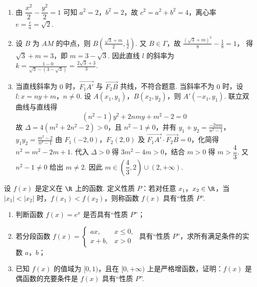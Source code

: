 \begin{solution}
\begin{enumerate}
\item 由 \(\dfrac{x^2}{2}-\dfrac{y^2}{2}=1\) 可知 \(a^2=2\)，\(b^2=2\)，故 \(c^2=a^2+b^2=4\)，离心率 \(e=\frac ca=\sqrt2\).

\item 设 \(B\) 为 \(AM\) 的中点，则
\(B\left(\frac{\sqrt3+m}{2},\frac12\right)\).
又 \(B\in\Gamma\)，故
\(\frac{(\sqrt3+m)^2}{8}-\frac{1}{8}=1\)，
得 \(\sqrt3+m=3\)，即 \(m=3-\sqrt3\).
因此直线 \(l\) 的斜率为
\(k=\frac{1-0}{\sqrt3-(3-\sqrt3)}=\frac{2\sqrt3+3}{3}\).

\item 当直线斜率为 \(0\) 时，\(\overrightarrow{F_1A'}\) 与 \(\overrightarrow{F_2B}\) 共线，不符合题意. 当斜率不为 \(0\) 时，设 \(l:x=ny+m\)，\(n\ne0\). 设 \(A(x_1,y_1)\)，\(B(x_2,y_2)\)，则 \(A'(-x_1,y_1)\).
联立双曲线与直线得
\[
(n^2-1)y^2+2nmy+m^2-2=0
\]
故 \(\Delta=4(m^2+2n^2-2)>0\)，且 \(n^2-1\ne0\)，并有
\(y_1+y_2=\frac{-2nm}{n^2-1}\)，\(y_1y_2=\frac{m^2-2}{n^2-1}\)
由 \(F_1(-2,0)\)，\(F_2(2,0)\) 及 \(\overrightarrow{F_1A'}\cdot\overrightarrow{F_2B}=0\)，化简得 \(n^2=m^2-2m+1\). 代入 \(\Delta>0\) 得 \(3m^2-4m>0\)，结合 \(m>0\) 得 \(m>\dfrac43\). 又 \(n^2-1\ne0\) 给出 \(m\ne2\). 因此 \(m\in\left(\dfrac43,2\right)\cup(2,+\infty)\).
\end{enumerate}
\end{solution}

\begin{problem}
设 \(f(x)\) 是定义在 \(\R\) 上的函数. 定义性质 \(P\)：若对任意 \(x_1\)，\(x_2\in\R\)，当 \(|x_1|<|x_2|\) 时，\(f(x_1)<f(x_2)\)，则称函数 \(f(x)\) 具有“性质 \(P\)”.

\begin{enumerate}
\item 判断函数 \(f(x)=e^x\) 是否具有“性质 \(P\)”；
\item 若分段函数
\(
f(x)=
\begin{cases}
ax,&x\le0,\\
x+b,&x>0
\end{cases}
\)
具有“性质 \(P\)”，求所有满足条件的实数 \(a\)，\(b\)；
\item 已知 \(f(x)\) 的值域为 \([0,1)\)，且在 \([0,+\infty)\) 上是严格增函数，证明：\(f(x)\) 是偶函数的充要条件是 \(f(x)\) 具有“性质 \(P\)”.
\end{enumerate}
\end{problem}

